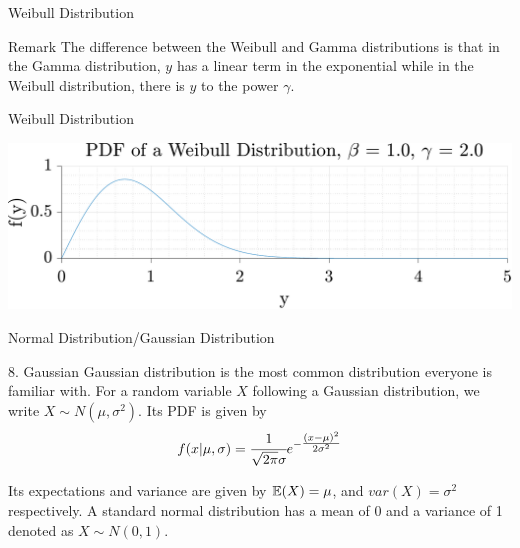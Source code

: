 \documentclass[aspectratio=169,xcolor=dvipsnames,svgnames,x11names,fleqn]{beamer}
\begin{document}

\begin{frame}[allowframebreaks]{Weibull Distribution}
    
    \begin{facts}{Remark}
       The difference between the Weibull and Gamma distributions is that in the Gamma distribution, $y$ has a linear term in the exponential while in the Weibull distribution, there is $y$ to the power $\gamma$.
        
    \end{facts}
    
\end{frame}
    

\begin{frame}[allowframebreaks]{Weibull Distribution}

     \begin{center}
    \includegraphics[width=.9\textwidth]{figures/Weibull.pdf}
    \end{center}
    
    \end{frame}
    
    
    \begin{frame}[allowframebreaks]{Normal Distribution/Gaussian Distribution}
        \begin{tblock}{8. Gaussian}
            Gaussian distribution is the most common distribution everyone is familiar with. For a random variable $X$ following a Gaussian distribution, we write $X\sim N(\mu, \sigma^2)$. Its PDF is given by
            \begin{equation}
                f(x | \mu, \sigma) = \cfrac{1}{\sqrt{2\pi}\sigma} e ^{- \tfrac{(x-\mu)^2}{2\sigma^2}}
            \end{equation}
        \end{tblock}
        Its expectations and variance are given by ${\mathbb E}(X) = \mu$, and $var(X) = \sigma^2$ respectively. A standard normal distribution has a mean of 0 and a variance of 1 denoted as $X\sim N(0,1)$.
        \end{frame}
    
\end{document}
